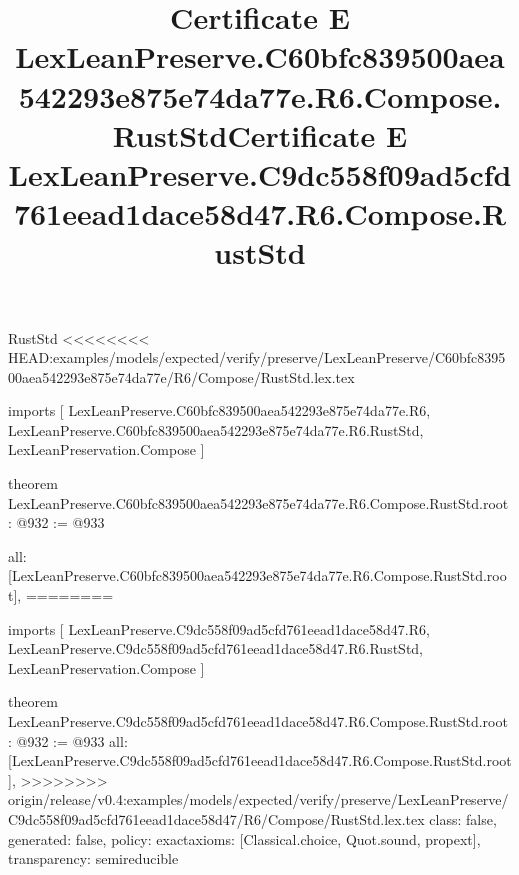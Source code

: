 \begin{lexlean}{RustStd}
<<<<<<<< HEAD:examples/models/expected/verify/preserve/LexLeanPreserve/C60bfc839500aea542293e875e74da77e/R6/Compose/RustStd.lex.tex
\title{Certificate E LexLeanPreserve.C60bfc839500aea542293e875e74da77e.R6.Compose.RustStd}
\begin{coremodule}
imports [
  LexLeanPreserve.C60bfc839500aea542293e875e74da77e.R6,
  LexLeanPreserve.C60bfc839500aea542293e875e74da77e.R6.RustStd,
  LexLeanPreservation.Compose
]

theorem LexLeanPreserve.C60bfc839500aea542293e875e74da77e.R6.Compose.RustStd.root : @932 := @933 {
  all: [LexLeanPreserve.C60bfc839500aea542293e875e74da77e.R6.Compose.RustStd.root],
========
\title{Certificate E LexLeanPreserve.C9dc558f09ad5cfd761eead1dace58d47.R6.Compose.RustStd}
\begin{coremodule}
imports [
  LexLeanPreserve.C9dc558f09ad5cfd761eead1dace58d47.R6,
  LexLeanPreserve.C9dc558f09ad5cfd761eead1dace58d47.R6.RustStd,
  LexLeanPreservation.Compose
]

theorem LexLeanPreserve.C9dc558f09ad5cfd761eead1dace58d47.R6.Compose.RustStd.root : @932 := @933 {
  all: [LexLeanPreserve.C9dc558f09ad5cfd761eead1dace58d47.R6.Compose.RustStd.root],
>>>>>>>> origin/release/v0.4:examples/models/expected/verify/preserve/LexLeanPreserve/C9dc558f09ad5cfd761eead1dace58d47/R6/Compose/RustStd.lex.tex
  class: false,
  generated: false,
  policy: exact{axioms: [Classical.choice, Quot.sound, propext]},
  transparency: semireducible
}


\end{coremodule}}
\end{coremodule}
\end{lexlean}
